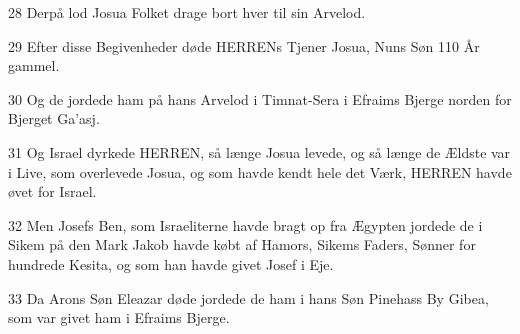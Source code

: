 \par 28 Derpå lod Josua Folket drage bort hver til sin Arvelod.
\par 29 Efter disse Begivenheder døde HERRENs Tjener Josua, Nuns Søn 110 År gammel.
\par 30 Og de jordede ham på hans Arvelod i Timnat-Sera i Efraims Bjerge norden for Bjerget Ga'asj.
\par 31 Og Israel dyrkede HERREN, så længe Josua levede, og så længe de Ældste var i Live, som overlevede Josua, og som havde kendt hele det Værk, HERREN havde øvet for Israel.
\par 32 Men Josefs Ben, som Israeliterne havde bragt op fra Ægypten jordede de i Sikem på den Mark Jakob havde købt af Hamors, Sikems Faders, Sønner for hundrede Kesita, og som han havde givet Josef i Eje.
\par 33 Da Arons Søn Eleazar døde jordede de ham i hans Søn Pinehass By Gibea, som var givet ham i Efraims Bjerge.



